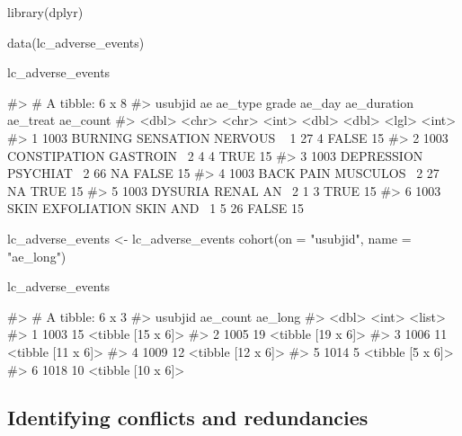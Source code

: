 \begin{Schunk}
\begin{Sinput}
library(dplyr)

data(lc_adverse_events)

lc_adverse_events %>% head()
\end{Sinput}
\begin{Soutput}
#> # A tibble: 6 x 8
#>   usubjid ae                ae_type   grade ae_day ae_duration ae_treat ae_count
#>     <dbl> <chr>             <chr>     <int>  <dbl>       <dbl> <lgl>       <int>
#> 1    1003 BURNING SENSATION NERVOUS ~     1     27           4 FALSE          15
#> 2    1003 CONSTIPATION      GASTROIN~     2      4           4 TRUE           15
#> 3    1003 DEPRESSION        PSYCHIAT~     2     66          NA FALSE          15
#> 4    1003 BACK PAIN         MUSCULOS~     2     27          NA TRUE           15
#> 5    1003 DYSURIA           RENAL AN~     2      1           3 TRUE           15
#> 6    1003 SKIN EXFOLIATION  SKIN AND~     1      5          26 FALSE          15
\end{Soutput}
\begin{Sinput}
lc_adverse_events <- lc_adverse_events %>%
  cohort(on = "usubjid", name = "ae_long")

lc_adverse_events %>% head()
\end{Sinput}
\begin{Soutput}
#> # A tibble: 6 x 3
#>   usubjid ae_count ae_long          
#>     <dbl>    <int> <list>           
#> 1    1003       15 <tibble [15 x 6]>
#> 2    1005       19 <tibble [19 x 6]>
#> 3    1006       11 <tibble [11 x 6]>
#> 4    1009       12 <tibble [12 x 6]>
#> 5    1014        5 <tibble [5 x 6]> 
#> 6    1018       10 <tibble [10 x 6]>
\end{Soutput}
\end{Schunk}

\hypertarget{identifying-conflicts-and-redundancies}{%
\subsection{Identifying conflicts and
redundancies}\label{identifying-conflicts-and-redundancies}}

